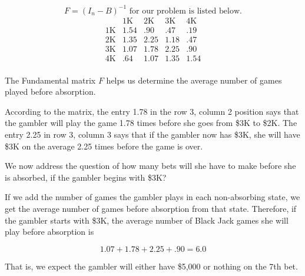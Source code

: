 \begin{solution}
    \[
        F = (I_n - B)^{-1} \text{ for our problem is listed below.}
    \]
    \[
        \begin{array}{c|cccc}
            \text{}   & \text{1K} & \text{2K} & \text{3K} & \text{4K} \\
            \hline
            \text{1K} & 1.54      & .90       & .47       & .19       \\
            \text{2K} & 1.35      & 2.25      & 1.18      & .47       \\
            \text{3K} & 1.07      & 1.78      & 2.25      & .90       \\
            \text{4K} & .64       & 1.07      & 1.35      & 1.54      \\
        \end{array}
    \]

    The Fundamental matrix \( F \) helps us determine the average number of games played before absorption.

    According to the matrix, the entry 1.78 in the row 3, column 2 position says that the gambler will  play the game 1.78 times before she goes from \$3K to \$2K.  The entry  2.25 in row 3, column 3 says that if the gambler now has \$3K, she will have \$3K on the average 2.25 times before the game is over.

    We now address the question of how many bets will she have to make before she is absorbed, if the gambler begins with \$3K?

    If we add the number of games the gambler plays in each non-absorbing state, we get the average number of games before absorption from that state. Therefore, if the gambler starts with \$3K, the average number of Black Jack games she will play before absorption is

    \[ 1.07 + 1.78 + 2.25 + .90 = 6.0 \]

    That is, we expect the gambler will either have \$5,000 or nothing on the 7th bet.


\end{solution}

